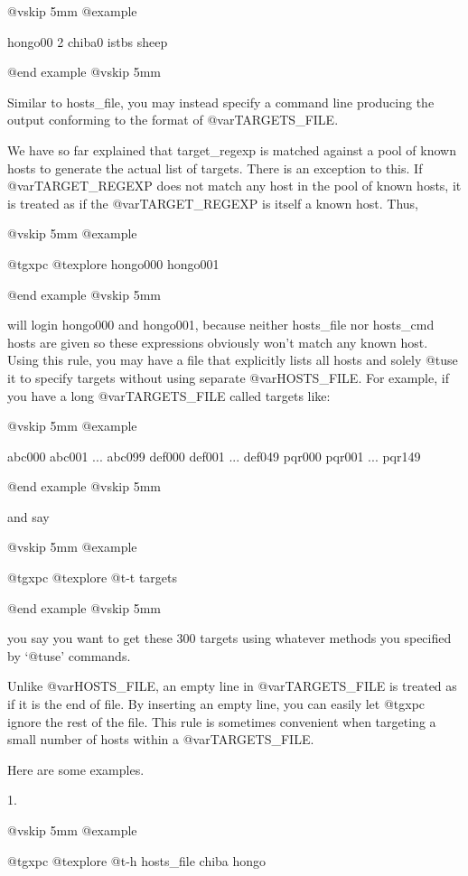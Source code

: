 @vskip 5mm
@example

  hongo00 2 chiba0
  istbs sheep

@end example
@vskip 5mm

Similar to hosts_file, you may instead specify a command line
producing the output conforming to the format of @var{TARGETS_FILE}.

We have so far explained that target_regexp is matched against a
pool of known hosts to generate the actual list of targets.
There is an exception to this. If @var{TARGET_REGEXP} does not match
any host in the pool of known hosts, it is treated as if the
@var{TARGET_REGEXP} is itself a known host. Thus,

@vskip 5mm
@example

  @t{gxpc} @t{explore} hongo000 hongo001

@end example
@vskip 5mm

will login hongo000 and hongo001, because neither hosts_file nor
hosts_cmd hosts are given so these expressions obviously won't
match any known host. Using this rule, you may have a file that
explicitly lists all hosts and solely @t{use} it to specify targets
without using separate @var{HOSTS_FILE}. For example, if you have a
long @var{TARGETS_FILE} called targets like:

@vskip 5mm
@example

  abc000
  abc001
    ...
  abc099
  def000
  def001
    ...
  def049
  pqr000
  pqr001
    ...
  pqr149

@end example
@vskip 5mm

and say

@vskip 5mm
@example

  @t{gxpc} @t{explore} @t{-t} targets

@end example
@vskip 5mm

you say you want to get these 300 targets using whatever methods
you specified by `@t{use}' commands.

Unlike @var{HOSTS_FILE}, an empty line in @var{TARGETS_FILE} is treated as if
it is the end of file. By inserting an empty line, you can easily
let @t{gxpc} ignore the rest of the file. This rule is sometimes
convenient when targeting a small number of hosts within a
@var{TARGETS_FILE}.

Here are some examples.

1.

@vskip 5mm
@example

  @t{gxpc} @t{explore} @t{-h} hosts_file chiba hongo

